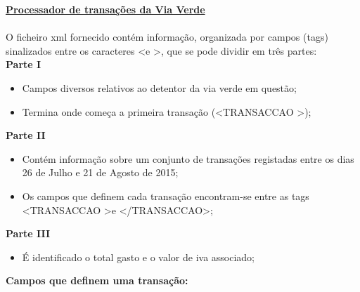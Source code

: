 \documentclass{report}
\begin{document}
\textbf{\underline{Processador de transa\c{c}\~oes da Via Verde}}
\\
\\
O ficheiro xml fornecido contém informa\c{c}\~ao, organizada por campos (tags) sinalizados entre os caracteres \textless  e \textgreater, que se pode dividir em três partes:\
\\
\textbf{Parte I}
\begin{itemize}
    \item Campos diversos relativos ao detentor da via verde em quest\~ao;
    \item Termina onde come\c{c}a a primeira transa\c{c}\~ao (\textless TRANSACCAO \textgreater);
\end{itemize}
\textbf{Parte II}
\begin{itemize}
    \item Contém informa\c{c}\~ao sobre um conjunto de transa\c{c}\~oes registadas entre os dias 26 de Julho e 21 de Agosto de 2015;
    \item Os campos que definem cada transa\c{c}\~ao encontram-se entre as tags \textless TRANSACCAO \textgreater e \textless/TRANSACCAO\textgreater;
\end{itemize}
\textbf{Parte III}
\begin{itemize}
    \item É identificado o total gasto e o valor de iva associado;
\end{itemize}

\textbf{Campos que definem uma transa\c{c}\~ao:}
\end{document}
